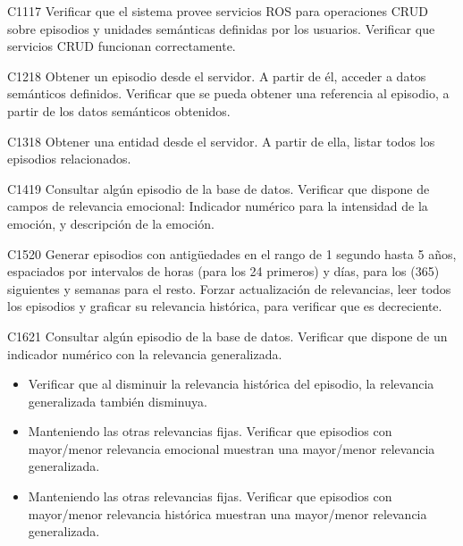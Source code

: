 \begin{def-validacion}{C}{11}{17}
	Verificar que el sistema provee servicios ROS para operaciones CRUD sobre episodios y unidades semánticas definidas por los usuarios. Verificar que servicios CRUD funcionan correctamente.
\end{def-validacion}

\begin{def-validacion}{C}{12}{18}
	Obtener un episodio desde el servidor. A partir de él, acceder a datos semánticos definidos. Verificar que se pueda obtener una referencia al episodio, a partir de los datos semánticos obtenidos.	
\end{def-validacion}

\begin{def-validacion}{C}{13}{18}
	Obtener una entidad desde el servidor. A partir de ella, listar todos los episodios relacionados.	
\end{def-validacion}

\begin{def-validacion}{C}{14}{19}
	Consultar algún episodio de la base de datos. Verificar que dispone de campos de relevancia emocional: Indicador numérico para la intensidad de la emoción, y descripción de la emoción.	
\end{def-validacion}

\begin{def-validacion}{C}{15}{20}
Generar episodios con antigüedades en el rango de 1 segundo hasta 5 años, espaciados por intervalos de horas (para los 24 primeros) y días, para los (365) siguientes y semanas para el resto. Forzar actualización de relevancias, leer todos los episodios y graficar su relevancia histórica, para verificar que es decreciente.	
\end{def-validacion}

\begin{def-validacion}{C}{16}{21}
Consultar algún episodio de la base de datos. Verificar que dispone de un indicador numérico con la relevancia generalizada.
\begin{itemize}
	\item Verificar que al disminuir la relevancia histórica del episodio, la relevancia generalizada también disminuya.
	\item Manteniendo las otras relevancias fijas. Verificar que episodios con mayor/menor relevancia emocional muestran una mayor/menor relevancia generalizada.
	\item Manteniendo las otras relevancias fijas. Verificar que episodios con mayor/menor relevancia histórica muestran una mayor/menor relevancia generalizada.
\end{itemize}	
\end{def-validacion}

